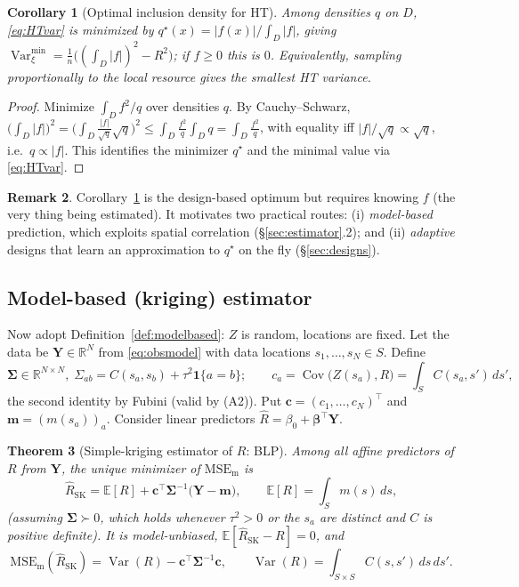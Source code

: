 \documentclass{amsart}
\newtheorem{theorem}{Theorem}
\newtheorem{corollary}[theorem]{Corollary}
\theoremstyle{definition}
\newtheorem{remark}[theorem]{Remark}
\newcommand{\R}{\mathbb{R}}
\newcommand{\E}{\mathbb{E}}
\newcommand{\Var}{\operatorname{Var}}
\newcommand{\Cov}{\operatorname{Cov}}
\newcommand{\Rhat}{\widehat R}
\begin{document}
\begin{corollary}[Optimal inclusion density for HT]\label{cor:optq}
Among densities $q$ on $D$, \eqref{eq:HTvar} is minimized by
$q^\star(x)=|f(x)|/\int_D|f|$, giving
$\Var_\xi^{\min}=\frac1n\big((\int_D|f|)^2-R^2\big)$; if $f\ge0$ this is
$0$. Equivalently, sampling proportionally to the local resource gives the
smallest HT variance.
\end{corollary}
\begin{proof}
Minimize $\int_D f^2/q$ over densities $q$. By Cauchy--Schwarz,
$\big(\int_D|f|\big)^2=\big(\int_D \tfrac{|f|}{\sqrt q}\sqrt q\big)^2\le
\int_D \tfrac{f^2}{q}\int_D q=\int_D\tfrac{f^2}{q}$, with equality iff
$|f|/\sqrt q \propto \sqrt q$, i.e.\ $q\propto|f|$. This identifies the
minimizer $q^\star$ and the minimal value via \eqref{eq:HTvar}.
\end{proof}

\begin{remark}
Corollary~\ref{cor:optq} is the design-based optimum but requires knowing
$f$ (the very thing being estimated). It motivates two practical routes:
(i) \emph{model-based} prediction, which exploits spatial correlation
(\S\ref{sec:estimator}.2); and (ii) \emph{adaptive} designs that learn an
approximation to $q^\star$ on the fly (\S\ref{sec:designs}).
\end{remark}

\subsection{Model-based (kriging) estimator}\label{ssec:krig}
Now adopt Definition~\ref{def:modelbased}: $Z$ is random, locations are
fixed. Let the data be $\mathbf Y\in\R^N$ from \eqref{eq:obsmodel} with
data locations $s_1,\dots,s_N\in S$. Define
\begin{equation}\label{eq:cveccov}
\boldsymbol\Sigma\in\R^{N\times N},\;
\Sigma_{ab}=C(s_a,s_b)+\tau^2\mathbf 1\{a=b\};\qquad
c_a=\Cov\!\big(Z(s_a),R\big)=\int_S C(s_a,s')\,ds' ,
\end{equation}
the second identity by Fubini (valid by (A2)). Put
$\mathbf c=(c_1,\dots,c_N)^\top$ and $\mathbf m=(m(s_a))_a$. Consider
linear predictors $\Rhat=\beta_0+\boldsymbol\beta^\top\mathbf Y$.

\begin{theorem}[Simple-kriging estimator of $R$: BLP]\label{thm:BLP}
Among all affine predictors of $R$ from $\mathbf Y$, the unique minimizer
of $\mathrm{MSE}_{\mathrm m}$ is
\begin{equation}\label{eq:BLP}
\Rhat_{\mathrm{SK}}
=\E[R]+\mathbf c^\top\boldsymbol\Sigma^{-1}\big(\mathbf Y-\mathbf m\big),
\qquad \E[R]=\int_S m(s)\,ds,
\end{equation}
(assuming $\boldsymbol\Sigma\succ0$, which holds whenever $\tau^2>0$ or the
$s_a$ are distinct and $C$ is positive definite). It is model-unbiased,
$\E[\Rhat_{\mathrm{SK}}-R]=0$, and
\begin{equation}\label{eq:BLPvar}
\mathrm{MSE}_{\mathrm m}(\Rhat_{\mathrm{SK}})
=\Var(R)-\mathbf c^\top\boldsymbol\Sigma^{-1}\mathbf c,
\qquad
\Var(R)=\int_{S\times S}C(s,s')\,ds\,ds'.
\end{equation}
\end{theorem}
\end{document}
